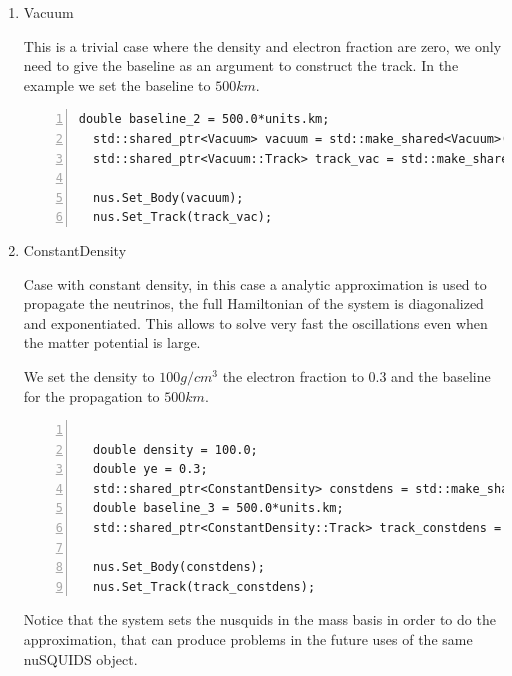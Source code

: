 \begin{enumerate}
\begin{lstlisting}[frame=leftline, numbers =
  left,breaklines=true,label = ex:sin1,firstnumber=last]
  std::shared_ptr<VariableDensity> vardens = std::make_shared<VariableDensity>(x_arr,density_arr,ye_arr);
  std::shared_ptr<VariableDensity::Track> track_vardens = std::make_shared<VariableDensity::Track>(0.0,200.0*units.km);

  nus.Set_Body(vardens);
  nus.Set_Track(track_vardens);
\end{lstlisting}

\item {\ttf Vacuum}

This is a trivial case where the density and electron fraction are
zero, we only need to give the baseline as an argument to construct
the track. In the example we set the baseline to $500km$.

\begin{lstlisting}[frame=leftline, numbers =
  left,breaklines=true,label = ex:sin1,firstnumber=last]
  double baseline_2 = 500.0*units.km;
  std::shared_ptr<Vacuum> vacuum = std::make_shared<Vacuum>();
  std::shared_ptr<Vacuum::Track> track_vac = std::make_shared<Vacuum::Track>(baseline_2);
  
  nus.Set_Body(vacuum);
  nus.Set_Track(track_vac);
\end{lstlisting}

\item {\ttf ConstantDensity}

Case with constant density, in this case a analytic approximation is
used to propagate the neutrinos, the full Hamiltonian of the system is
diagonalized and exponentiated. This allows to solve very fast the
oscillations even when the matter potential is large.

We set the density to $100g/cm^3$ the electron fraction to 0.3 and the
baseline for the propagation to $500km$.
\begin{lstlisting}[frame=leftline, numbers =
  left,breaklines=true,label = ex:sin1,firstnumber=last]

  double density = 100.0;
  double ye = 0.3;
  std::shared_ptr<ConstantDensity> constdens = std::make_shared<ConstantDensity>(density,ye);
  double baseline_3 = 500.0*units.km;
  std::shared_ptr<ConstantDensity::Track> track_constdens =   std::make_shared<ConstantDensity::Track>(0.0,baseline_3);

  nus.Set_Body(constdens);
  nus.Set_Track(track_constdens);
\end{lstlisting}

Notice that the system sets the nusquids in the mass basis in order to
do the approximation, that can produce problems in the future uses of
the same nuSQUIDS object.

\end{enumerate}


